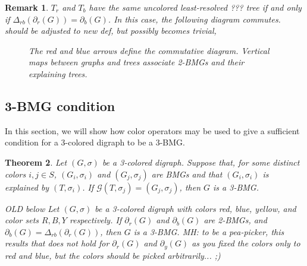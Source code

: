 \documentclass[final,3p,times]{elsarticle}
\newtheorem{theorem}{Theorem}[section]
\newtheorem{remark}[theorem]{Remark}%
\newcommand{\TODO}[1]{\begingroup\color{red}#1\endgroup}
\newcommand{\mh}[1]{\begingroup\color{blue}#1\endgroup}
\begin{document}
\begin{remark}
\label{obs:delta_operator}
$T_r$ and $T_b$ have the same uncolored \TODO{least-resolved ??? } tree if and only if $\Delta_{rb}(\partial_r(G))=\partial_b(G)$. In this case, the following diagram commutes.
\TODO{should be adjusted to new def, but possibly becomes trivial, } %
\begin{figure}[ht]
  \centering
{}
\caption{The red and blue arrows define the commutative diagram. Vertical maps between graphs and trees associate 2-BMGs and their explaining trees.}
\label{fig:diagram}
\end{figure}
\end{remark}

\subsection{3-BMG condition}
\label{sec:3-BMG condition}
In this section, we will show how color operators may be used to give a sufficient condition for a 3-colored digraph to be a 3-BMG.

\begin{theorem}\label{thm:sufficient_condition-old}
\mh{Let $(G,\sigma)$ be a 3-colored digraph. Suppose that, 
for some distinct colors $i,j\in S$, $(G_i,\sigma_i)$ and $(G_j,\sigma_j)$
are BMGs and  that $(G_i,\sigma_i)$ is explained by $(T,\sigma_i)$.
If $\mathcal{G}(T,\sigma_j) = (G_j,\sigma_j)$, then $G$ is a 3-BMG.  }


\TODO{OLD below}
Let $(G,\sigma)$ be a 3-colored digraph with colors red, blue, yellow, and color sets $R,B,Y$ respectively. If $\partial_r(G)$ and $\partial_b(G)$ are 2-BMGs, and $\partial_b(G)=\Delta_{rb}(\partial_r(G))$, then $G$ is a 3-BMG. \TODO{MH: to be a pea-picker, this results that does not hold
for  $\partial_r(G)$ and $\partial_y(G)$ as you fixed the colors only to red and blue, but the colors should be picked arbitrarily... ;)  }
\end{theorem}
\end{document}
